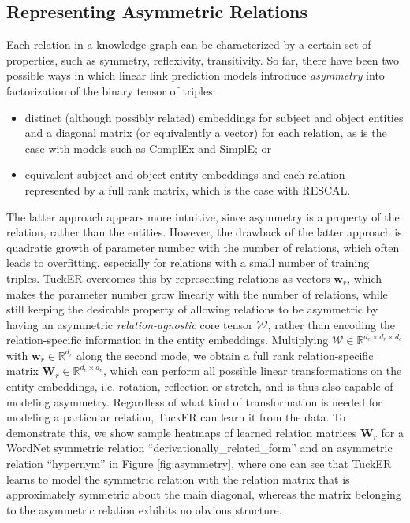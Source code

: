 \documentclass[11pt,a4paper]{article}
\begin{document}
\subsection{Representing Asymmetric Relations}
Each relation in a knowledge graph can be characterized by a certain set of properties, such as symmetry, reflexivity, transitivity. So far, there have been two possible ways in which linear link prediction models introduce \textit{asymmetry} into factorization of the binary tensor of triples:
\vspace{-0.1cm}
\begin{itemize}
    \item distinct (although possibly related) embeddings for subject and object entities and a diagonal matrix (or equivalently a vector) for each relation, as is the case with models such as ComplEx and SimplE; or
    \item equivalent subject and object entity embeddings and each relation represented by a full rank matrix, which is the case with RESCAL.
\end{itemize}
The latter approach appears more intuitive, since asymmetry is a property of the relation, rather than the entities. However, the drawback of the latter approach is quadratic growth of parameter number with the number of relations, which often leads to overfitting, especially for relations with a small number of training triples. TuckER overcomes this by representing relations as vectors $\mathbf{w}_r$, which makes the parameter number grow linearly with the number of relations, while still keeping the desirable property of allowing relations to be asymmetric by having an asymmetric \textit{relation-agnostic} core tensor $\mathcal{W}$, rather than encoding the relation-specific information in the entity embeddings. Multiplying $\mathcal{W} \in \mathbb{R}^{d_e \times d_r \times d_e}$ with $\mathbf{w}_r \in \mathbb{R}^{d_r}$ along the second mode, we obtain a full rank relation-specific matrix $\mathbf{W}_r \in \mathbb{R}^{d_e \times d_e}$, which can perform all possible linear transformations on the entity embeddings, i.e. rotation, reflection or stretch, and is thus also capable of modeling asymmetry. Regardless of what kind of transformation is needed for modeling a particular relation, TuckER can learn it from the data. To demonstrate this, we show sample heatmaps of learned relation matrices $\mathbf{W}_r$ for a WordNet symmetric relation ``derivationally\_related\_form'' and an asymmetric relation ``hypernym'' in Figure \ref{fig:asymmetry}, where one can see that TuckER learns to model the symmetric relation with the relation matrix that is approximately symmetric about the main diagonal, whereas the matrix belonging to the asymmetric relation exhibits no obvious structure.
\end{document}
